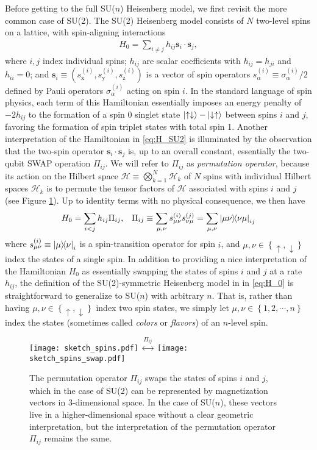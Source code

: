 \documentclass[nofootinbib,notitlepage,11pt]{revtex4-2}
\newcommand{\p}[1]{\left(#1\right)} %
\renewcommand{\set}[1]{\left\{#1\right\}} %
\renewcommand{\c}{\cdot} %
\newcommand{\m}{\bm} %
\newcommand{\1}{\mathds{1}}
\newcommand{\up}{\uparrow}
\newcommand{\dn}{\downarrow}
\newcommand{\x}{\text{x}}
\newcommand{\y}{\text{y}}
\newcommand{\z}{\text{z}}
\renewcommand{\H}{\mathcal{H}}
\begin{document}
Before getting to the full SU($n$) Heisenberg model, we first revisit
the more common case of SU(2).  The SU(2) Heisenberg model consists of
$N$ two-level spins on a lattice, with spin-aligning interactions
\begin{align}
  H_0 = \sum_{i\ne j} h_{ij} \m s_i \c\m s_j,
  \label{eq:H_SU2}
\end{align}
where $i,j$ index individual spins; $h_{ij}$ are scalar coefficients
with $h_{ij}=h_{ji}$ and $h_{ii}=0$; and
$\m s_i\equiv\p{s_\x^{(i)},s_\y^{(i)},s_\z^{(i)}}$ is a vector of spin
operators $s_\alpha^{(i)}\equiv\sigma_\alpha^{(i)}/2$ defined by Pauli
operators $\sigma_\alpha^{(i)}$ acting on spin $i$.  In the standard
language of spin physics, each term of this Hamiltonian essentially
imposes an energy penalty of $-2h_{ij}$ to the formation of a spin 0
singlet state $\ket{\up\dn}-\ket{\dn\up}$ between spins $i$ and $j$,
favoring the formation of spin triplet states with total spin 1.
Another interpretation of the Hamiltonian in \eqref{eq:H_SU2} is
illuminated by the observation that the two-spin operator
$\m s_i\c\m s_j$ is, up to an overall constant, essentially the
two-qubit SWAP operation $\Pi_{ij}$.  We will refer to $\Pi_{ij}$ as
{\it permutation operator}, because its action on the Hilbert space
$\H\equiv\bigotimes_{k=1}^N\H_k$ of $N$ spins with individual Hilbert
spaces $\H_k$ is to permute the tensor factors of $\H$ associated with
spins $i$ and $j$ (see Figure \ref{fig:sketch_spins}).  Up to identity
terms with no physical consequence, we then have
\begin{align}
  H_0 = \sum_{i<j} h_{ij} \Pi_{ij},
  &&
  \Pi_{ij} \equiv \sum_{\mu,\nu} s_{\mu\nu}^{(i)} s_{\nu\mu}^{(j)}
  = \sum_{\mu,\nu} \op{\mu\nu}{\nu\mu}_{ij}
  \label{eq:H_0}
\end{align}
where $s_{\mu\nu}^{(i)}\equiv\op{\mu}{\nu}_i$ is a spin-transition
operator for spin $i$, and $\mu,\nu\in\set{\up,\dn}$ index the states
of a single spin.  In addition to providing a nice interpretation of
the Hamiltonian $H_0$ as essentially swapping the states of spins $i$
and $j$ at a rate $h_{ij}$, the definition of the SU(2)-symmetric
Heisenberg model in in \eqref{eq:H_0} is straightforward to generalize
to SU($n$) with arbitrary $n$.  That is, rather than having
$\mu,\nu\in\set{\up,\dn}$ index two spin states, we simply let
$\mu,\nu\in\set{1,2,\cdots,n}$ index the states (sometimes called {\it
  colors} or {\it flavors}) of an $n$-level spin.

\begin{figure}
  \centering
  \texttt{[image: sketch\_spins.pdf]}
  $\stackrel{\displaystyle\Pi_{ij}}
  {\displaystyle\longleftrightarrow}$
  \texttt{[image: sketch\_spins\_swap.pdf]}
  \caption{The permutation operator $\Pi_{ij}$ swaps the states of
    spins $i$ and $j$, which in the case of SU(2) can be represented
    by magnetization vectors in 3-dimensional space.  In the case of
    SU($n$), these vectors live in a higher-dimensional space without
    a clear geometric interpretation, but the interpretation of the
    permutation operator $\Pi_{ij}$ remains the same.}
  \label{fig:sketch_spins}
\end{figure}
\end{document}
